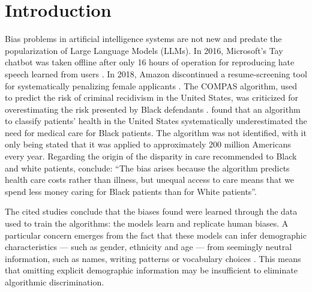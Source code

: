 \documentclass[12pt,a4paper]{article}
\begin{document}
\section{Introduction}


Bias problems in artificial intelligence systems are not new and predate the popularization of Large Language Models (LLMs). In 2016, Microsoft's Tay chatbot was taken offline after only 16 hours of operation for reproducing hate speech learned from users \citep{wolf2017}.
In 2018, Amazon discontinued a resume-screening tool for systematically penalizing female applicants \citep{dastin2018}. The
COMPAS algorithm, used to predict the risk of criminal recidivism in the United States, was criticized for overestimating the risk presented by Black defendants \citep{angwin2016}. \citet{obermeyer2019} found that an algorithm to classify patients' health in the United States systematically underestimated the need for medical care for Black patients. The algorithm was not identified, with it only being stated that it was applied to approximately 200 million Americans every year. Regarding the origin of the disparity in care recommended to Black and white patients, \citet[p.~447]{obermeyer2019} conclude:
``The bias arises because the algorithm predicts health care costs rather than illness, but unequal access to care means that we spend less money caring for Black patients than for White patients''.

The cited studies conclude that the biases found were learned through the data used to train the algorithms: the models learn and replicate human biases. A particular concern emerges from the fact that these models can infer demographic characteristics
--- such as gender, ethnicity and age --- from seemingly neutral information, such as names, writing patterns or vocabulary choices \citep{bai2024}. This means that omitting explicit demographic information may be insufficient to eliminate algorithmic discrimination.
\end{document}
